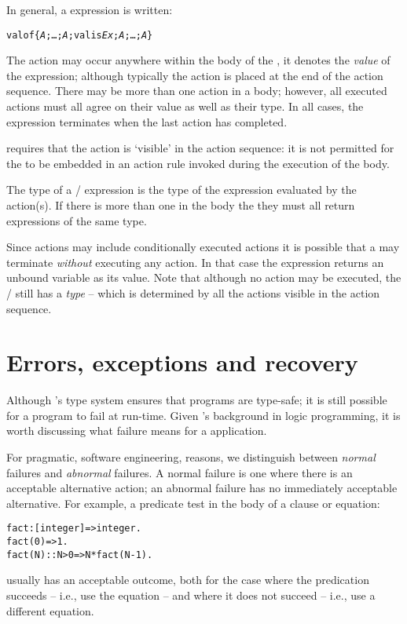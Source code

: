 In general, a  expression is written:
\begin{alltt}
valof\{ \emph{A};\ldots;\emph{A};valis \emph{Ex};\emph{A};\ldots;\emph{A\subn}\}
\end{alltt}
The  action may occur anywhere within the body of the , it denotes the \emph{value} of the  expression; although typically the  action is placed at the end of the action sequence. There may be more than one  action in a  body; however, all executed  actions must all agree on their value as well as their type. In all cases, the  expression terminates when the last action has completed.

\go requires that the  action is `visible' in the action sequence: it is not permitted for the  to be embedded in an action rule invoked during the execution of the  body.

The type of a / expression is the type of the expression evaluated by the  action(s). If there is more than one  in the body the they must all return expressions of the same type.

Since actions may include conditionally executed actions it is possible that a  may terminate \emph{without} executing any  action. In that case the  expression returns an unbound variable as its value. Note that although no  action may be executed, the / still has a \emph{type} -- which is determined by all the  actions visible in the action sequence.

\section{Errors, exceptions and recovery}
\label{expression:error}
Although \go's type system ensures that programs are type-safe; it is still possible for a program to fail at run-time. Given \go's background in logic programming, it is worth discussing what failure means for a \go application. 

For pragmatic, software engineering, reasons, we distinguish between \emph{normal} failures and \emph{abnormal} failures. A normal failure is one where there is an acceptable alternative action; an abnormal failure has no immediately acceptable alternative. For example, a predicate test in the body of a clause or equation:
\begin{alltt}
fact:[integer]=>integer.
fact(0) => 1.
fact(N) :: N>0 => N*fact(N-1).
\end{alltt}
usually has an acceptable outcome, both for the case where the predication succeeds  -- i.e., use the equation -- and where it does not succeed -- i.e., use a different equation.

